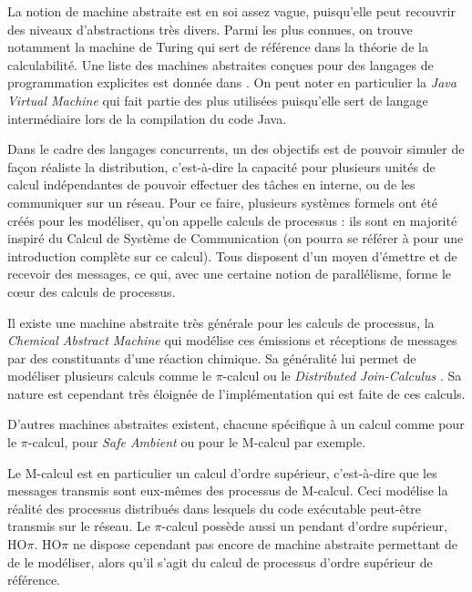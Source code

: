 \documentclass[11pt]{article}
\newcounter{c_theo}
\newcounter{c_def}
\begin{document}
La notion de machine abstraite est en soi assez vague, puisqu'elle peut recouvrir des niveaux d'abstractions très divers.
Parmi les plus connues, on trouve notamment la machine de Turing qui sert de référence dans la théorie de la calculabilité.
Une liste des machines abstraites conçues pour des langages de programmation explicites est donnée dans \cite{Diehl00}. On peut noter en particulier la \emph{Java Virtual Machine} qui fait partie des plus utilisées puisqu'elle sert de langage intermédiaire lors de la compilation du code Java.

Dans le cadre des langages concurrents, un des objectifs est de pouvoir simuler de façon réaliste la distribution, c'est-à-dire la capacité pour plusieurs unités de calcul indépendantes de pouvoir effectuer des tâches en interne, ou de les communiquer sur un réseau.
Pour ce faire, plusieurs systèmes formels ont été créés pour les modéliser, qu'on appelle calculs de processus : ils sont en majorité inspiré du Calcul de Système de Communication (on pourra se référer à \cite{Milner82} pour une introduction complète sur ce calcul).
Tous disposent d'un moyen d'émettre et de recevoir des messages, ce qui, avec une certaine notion de parallélisme, forme le c\oe ur des calculs de processus.

Il existe une machine abstraite très générale pour les calculs de processus, la \emph{Chemical Abstract Machine} \cite{Berry92} qui modélise ces émissions et réceptions de messages par des constituants d'une réaction chimique. Sa généralité lui permet de modéliser plusieurs calculs comme le $\pi$-calcul \cite{Gonthier96} ou le \emph{Distributed Join-Calculus} \cite{Fournet96}.
Sa nature est cependant très éloignée de l'implémentation qui est faite de ces calculs.

D'autres machines abstraites existent, chacune spécifique à un calcul comme \cite{Bidinger09} pour le $\pi$-calcul, \cite{Sangiorgi01} pour \emph{Safe Ambient} ou \cite{Germain02} pour le M-calcul par exemple.

Le M-calcul est en particulier un calcul d'ordre supérieur, c'est-à-dire que les messages transmis sont eux-mêmes des processus de M-calcul. Ceci modélise la réalité des processus distribués dans lesquels du code exécutable peut-être transmis sur le réseau.
Le $\pi$-calcul possède aussi un pendant d'ordre supérieur, HO$\pi$\cite{Sangiorgi93}.
HO$\pi$ ne dispose cependant pas encore de machine abstraite permettant de de le modéliser, alors qu'il s'agit du calcul de processus d'ordre supérieur de référence.
\end{document}
